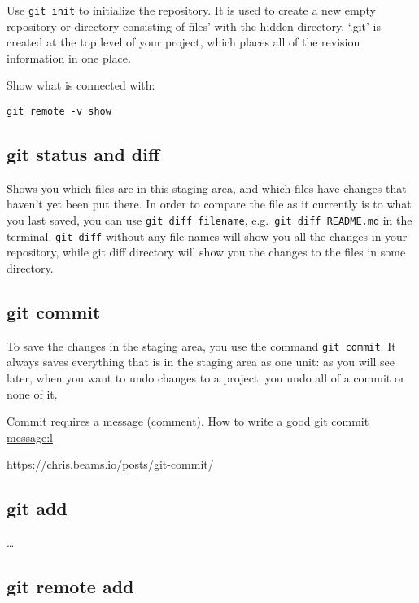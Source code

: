 \documentclass[
]{book}
\begin{document}
Use \texttt{git\ init} to initialize the repository. It is used to create a new empty repository or directory consisting of files' with the hidden directory. `.git' is created at the top level of your project, which places all of the revision information in one place.

Show what is connected with:

\begin{verbatim}
git remote -v show
\end{verbatim}

\hypertarget{git-status-and-diff}{%
\subsection{git status and diff}\label{git-status-and-diff}}

Shows you which files are in this staging area, and which files have changes that haven't yet been put there. In order to compare the file as it currently is to what you last saved, you can use \texttt{git\ diff\ filename}, e.g.~\texttt{git\ diff\ README.md} in the terminal. \texttt{git\ diff} without any file names will show you all the changes in your repository, while git diff directory will show you the changes to the files in some directory.

\hypertarget{git-commit}{%
\subsection{git commit}\label{git-commit}}

To save the changes in the staging area, you use the command \texttt{git\ commit}. It always saves everything that is in the staging area as one unit: as you will see later, when you want to undo changes to a project, you undo all of a commit or none of it.

Commit requires a message (comment). How to write a good git commit \url{message:l}

\url{https://chris.beams.io/posts/git-commit/}

\hypertarget{git-add}{%
\subsection{git add}\label{git-add}}

\ldots{}

\hypertarget{git-remote-add}{%
\subsection{git remote add}\label{git-remote-add}}
\end{document}
